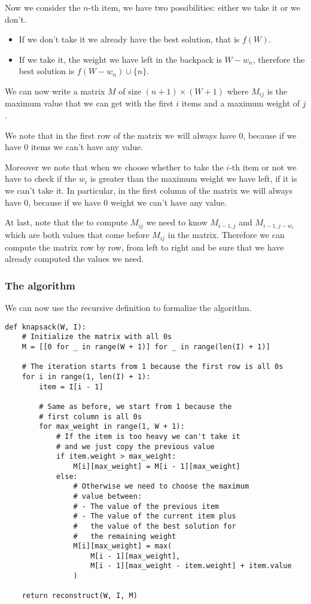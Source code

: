 \documentclass[12pt]{extarticle}
\begin{document}
Now we consider the $n$-th item, we have two possibilities: either we take it or we don't.
\begin{itemize}
    \item If we don't take it we already have the best solution, that is $f(W)$.
    \item If we take it, the weight we have left in the backpack is $W - w_n$, therefore the best solution is $f(W - w_n) \cup \{n\}$.
\end{itemize}

We can now write a matrix $M$ of size $(n + 1) \times (W + 1)$ where $M_{ij}$ is the maximum value that we can get with the first $i$ items and a maximum weight of $j$.

We note that in the first row of the matrix we will always have 0, because if we have 0 items we can't have any value.

Moreover we note that when we choose whether to take the $i$-th item or not we have to check if the $w_i$ is greater than the maximum weight we have left, if it is we can't take it.
In particular, in the first column of the matrix we will always have 0, because if we have 0 weight we can't have any value.

At last, note that the to compute $M_{ij}$ we need to know $M_{i-1, j}$ and $M_{i-1, j - w_i}$ which are both values that come before $M_{ij}$ in the matrix.
Therefore we can compute the matrix row by row, from left to right and be sure that we have already computed the values we need.

\subsubsection{The algorithm}

We can now use the recursive definition to formalize the algorithm.

\begin{verbatim}
def knapsack(W, I):
    # Initialize the matrix with all 0s
    M = [[0 for _ in range(W + 1)] for _ in range(len(I) + 1)]

    # The iteration starts from 1 because the first row is all 0s
    for i in range(1, len(I) + 1):
        item = I[i - 1]

        # Same as before, we start from 1 because the 
        # first column is all 0s
        for max_weight in range(1, W + 1):
            # If the item is too heavy we can't take it
            # and we just copy the previous value
            if item.weight > max_weight:
                M[i][max_weight] = M[i - 1][max_weight]
            else:
                # Otherwise we need to choose the maximum
                # value between:
                # - The value of the previous item
                # - The value of the current item plus
                #   the value of the best solution for
                #   the remaining weight
                M[i][max_weight] = max(
                    M[i - 1][max_weight],
                    M[i - 1][max_weight - item.weight] + item.value
                )

    return reconstruct(W, I, M)
\end{verbatim}
\end{document}
